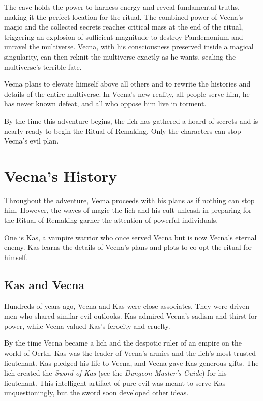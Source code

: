 \documentclass[10pt,a4paper,twoside,bg=print,twocolumn,openany,nodeprecatedcode]{dndbook}
\begin{document}
The cave holds the power to harness energy and reveal fundamental truths, making it the perfect location for the ritual. The combined power of Vecna's magic and the collected secrets reaches critical mass at the end of the ritual, triggering an explosion of sufficient magnitude to destroy Pandemonium and unravel the multiverse. Vecna, with his consciousness preserved inside a magical singularity, can then reknit the multiverse exactly as he wants, sealing the multiverse's terrible fate.

Vecna plans to elevate himself above all others and to rewrite the histories and details of the entire multiverse. In Vecna's new reality, all people serve him, he has never known defeat, and all who oppose him live in torment.

By the time this adventure begins, the lich has gathered a hoard of secrets and is nearly ready to begin the Ritual of Remaking. Only the characters can stop Vecna's evil plan.

\section{Vecna's History}
Throughout the adventure, Vecna proceeds with his plans as if nothing can stop him. However, the waves of magic the lich and his cult unleash in preparing for the Ritual of Remaking garner the attention of powerful individuals.

One is Kas, a vampire warrior who once served Vecna but is now Vecna's eternal enemy. Kas learns the details of Vecna's plans and plots to co-opt the ritual for himself.

\subsection{Kas and Vecna}
Hundreds of years ago, Vecna and Kas were close associates. They were driven men who shared similar evil outlooks. Kas admired Vecna's sadism and thirst for power, while Vecna valued Kas's ferocity and cruelty.

By the time Vecna became a lich and the despotic ruler of an empire on the world of Oerth, Kas was the leader of Vecna's armies and the lich's most trusted lieutenant. Kas pledged his life to Vecna, and Vecna gave Kas generous gifts. The lich created the \textit{Sword of Kas} (see the \textit{Dungeon Master's Guide}) for his lieutenant. This intelligent artifact of pure evil was meant to serve Kas unquestioningly, but the sword soon developed other ideas.
\end{document}
